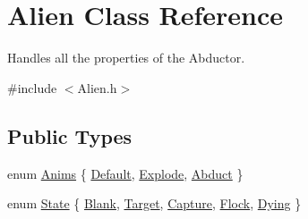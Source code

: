 \hypertarget{class_alien}{}\section{Alien Class Reference}
\label{class_alien}


Handles all the properties of the Abductor.  




{\ttfamily \#include $<$Alien.\+h$>$}

\subsection*{Public Types}
\begin{DoxyCompactItemize}
\item 
enum \hyperlink{class_alien_a46333b42b6e6dff962c3236b7012ec8c}{Anims} \{ \hyperlink{class_alien_a46333b42b6e6dff962c3236b7012ec8ca7a4a36a6254d3844899e487586e46337}{Default}, 
\hyperlink{class_alien_a46333b42b6e6dff962c3236b7012ec8ca04a2fe3761bed6d947586432c4747a1c}{Explode}, 
\hyperlink{class_alien_a46333b42b6e6dff962c3236b7012ec8ca44b86fba8c2c960652279d9e807061c4}{Abduct}
 \}
\item 
enum \hyperlink{class_alien_a493c0f699c9ae8b2b714f9c739a2400d}{State} \{ \newline
\hyperlink{class_alien_a493c0f699c9ae8b2b714f9c739a2400da816f7fd79da3c3d0d394fb4e3930f5d8}{Blank}, 
\hyperlink{class_alien_a493c0f699c9ae8b2b714f9c739a2400dafa74abaf987256bdeb9f2df8a69ffd08}{Target}, 
\hyperlink{class_alien_a493c0f699c9ae8b2b714f9c739a2400dae02a372972a7b4862d4840321e663e31}{Capture}, 
\hyperlink{class_alien_a493c0f699c9ae8b2b714f9c739a2400da5f2f5d641e92fc16ce133da2ca32f709}{Flock}, 
\newline
\hyperlink{class_alien_a493c0f699c9ae8b2b714f9c739a2400da90dc39d1c949da5f9fb7703938b99c53}{Dying}
 \}
\end{DoxyCompactItemize}
